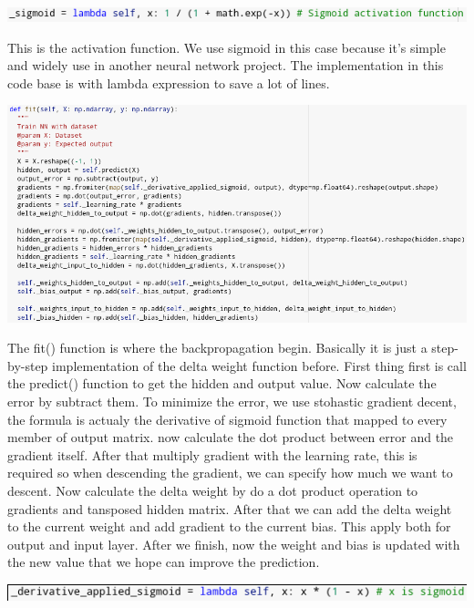 \documentclass[a4paper, 12pt]{article}
\begin{document}
\begin{multicols}{2}
\centering
\vspace{0.2cm}
\includegraphics[scale=0.315]{nn_4}
\vspace{0.2cm}

\justifying
This is the activation function. We use sigmoid in this case because it's simple and widely use in another neural network project. The implementation in this code base is with lambda expression to save a lot of lines.

\centering
\vspace{0.2cm}
\includegraphics[scale=0.21]{nn_5}
\vspace{0.2cm}

\justifying
The fit() function is where the backpropagation begin. Basically it is just a step-by-step implementation of the delta weight function before. First thing first is call the predict() function to get the hidden and output value. Now calculate the error by subtract them. To minimize the error, we use stohastic gradient decent, the formula is actualy the derivative of sigmoid function that mapped to every member of output matrix. now calculate the dot product between error and the
gradient itself. After that multiply gradient with the learning rate, this is required so when descending the gradient, we can specify how much we want to descent. Now calculate the delta weight by do a dot product operation to gradients and tansposed hidden matrix. After that we can add the delta weight to the current weight and add gradient to the current bias. This apply both for output and input layer. After we finish, now the weight and bias is updated with the new value that we
hope can improve the prediction.

\centering
\vspace{0.2cm}
\includegraphics[scale=0.35]{nn_7}
\vspace{0.2cm}


\end{multicols}
\end{document}

